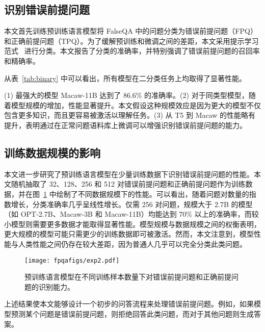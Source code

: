 \subsection{识别错误前提问题}
本文首先训练预训练语言模型将 FalseQA 中的问题分类为错误前提问题（FPQ）和正确前提问题（TPQ）。为了缓解预训练和微调之间的差距，本文采用提示学习范式~\cite{schick-schutze-2021-exploiting,10.1145/3560815} 进行分类。本文报告了分类的准确率，并特别强调了错误前提问题的召回率和精确率。

从表~\ref{tab:binary} 中可以看出，所有模型在二分类任务上均取得了显著性能。

(1) 最强大的模型 Macaw-11B 达到了 86.6\% 的准确率。(2) 对于同类型模型，随着模型规模的增加，性能显著提升。本文假设这种规模效应是因为更大的模型不仅包含更多知识，而且更容易被激活以理解任务。(3) 从 T5 到 Macaw 的性能略有提升，表明通过在正常问题语料库上微调可以增强识别错误前提问题的能力。

\subsection{训练数据规模的影响}
本文进一步研究了预训练语言模型在少量训练数据下识别错误前提问题的性能。本文随机抽取了 32、128、256 和 512 对错误前提问题和正确前提问题作为训练数据，并在图~\ref{fig:scale} 中绘制了不同数据规模下的性能。可以看出，随着问题对数量的指数增长，分类准确率几乎呈线性增长。仅需 256 对问题，规模大于 2.7B 的模型（如 OPT-2.7B、Macaw-3B 和 Macaw-11B）均能达到 70\% 以上的准确率，而较小模型则需要更多数据才能取得显著性能。模型规模与数据规模之间的权衡表明，更大规模的模型可能只需更少的训练数据即可被激活。然而，本文注意到，模型性能与人类性能之间仍存在较大差距，因为普通人几乎可以完全分类此类问题。

\begin{figure}
    \centering
    \texttt{[image: fpqafigs/exp2.pdf]}
    \caption{预训练语言模型在不同训练样本数量下对错误前提问题和正确前提问题的识别能力。}
    \label{fig:scale}
\end{figure}

上述结果使本文能够设计一个初步的问答流程来处理错误前提问题。例如，如果模型预测某个问题是错误前提问题，则拒绝回答此类问题，而对于其他问题则生成答案。

